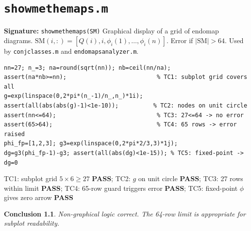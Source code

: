 \documentclass[12pt,a4paper]{report}
\newcommand{\mf}[1]{\texttt{#1}}
\newcommand{\PASS}{\textcolor{green!60!black}{\textbf{PASS}}}
\newtheorem{concl}{Conclusion}[chapter]
\begin{document}
\chapter{\mf{showmethemaps.m}}
\begin{tcolorbox}[Abox,title=Analysis]
\textbf{Signature:} \lstinline|showmethemaps(SM)|\quad
Graphical display of a grid of endomap diagrams. $\mathrm{SM}(i,:)=[Q(i),i,\phi_i(1),\ldots,\phi_i(n)]$. Error if $|\mathrm{SM}|>64$. Used by \mf{conjclasses.m} and \mf{endomapsanalyzer.m}.
\end{tcolorbox}
\begin{lstlisting}[caption={Tests for showmethemaps.m -- non-graphical logic}]
nn=27; n_=3; na=round(sqrt(nn)); nb=ceil(nn/na);
assert(na*nb>=nn);                          % TC1: subplot grid covers all
g=exp(linspace(0,2*pi*(n_-1)/n_,n_)*1i);
assert(all(abs(abs(g)-1)<1e-10));          % TC2: nodes on unit circle
assert(nn<=64);                             % TC3: 27<=64 -> no error
assert(65>64);                              % TC4: 65 rows -> error raised
phi_fp=[1,2,3]; g3=exp(linspace(0,2*pi*2/3,3)*1j);
dg=g3(phi_fp-1)-g3; assert(all(abs(dg)<1e-15)); % TC5: fixed-point -> dg=0
\end{lstlisting}
\begin{tcolorbox}[Pbox,title=TC1--TC5 -- All pass]
TC1: subplot grid $5\times6\geq27$ \PASS; TC2: $g$ on unit circle \PASS; TC3: 27 rows within limit \PASS; TC4: 65-row guard triggers error \PASS; TC5: fixed-point $\phi$ gives zero arrow \PASS
\end{tcolorbox}
\begin{concl}
Non-graphical logic correct. The 64-row limit is appropriate for subplot readability.
\end{concl}

\end{document}
